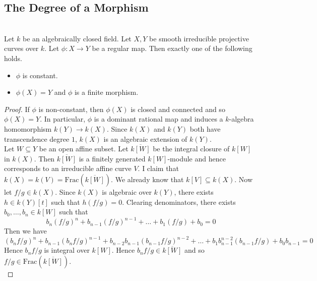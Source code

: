 \documentclass[a4paper]{article}
\begin{document}
\subsection{The Degree of a Morphism}
\begin{prp}{}{}\\
Let $k$ be an algebraically closed field. Let $X,Y$ be smooth irreducible projective curves over $k$. Let $\phi:X\to Y$ be a regular map. Then exactly one of the following holds. 
\begin{itemize}
\item $\phi$ is constant. 
\item $\phi(X)=Y$ and $\phi$ is a finite morphism. 
\end{itemize}
\begin{proof}
If $\phi$ is non-constant, then $\phi(X)$ is closed and connected and so $\phi(X)=Y$. In particular, $\phi$ is a dominant rational map and induces a $k$-algebra homomorphism $k(Y)\to k(X)$. Since $k(X)$ and $k(Y)$ both have transcendence degree $1$, $k(X)$ is an algebraic extension of $k(Y)$. \\

Let $W\subseteq Y$ be an open affine subset. Let $\overline{k[W]}$ be the integral closure of $k[W]$ in $k(X)$. Then $\overline{k[W]}$ is a finitely generated $k[W]$-module and hence corresponds to an irreducible affine curve $V$. I claim that $k(X)=k(V)=\text{Frac}(\overline{k[W]})$. We already know that $k[V]\subseteq k(X)$. Now let $f/g\in k(X)$. Since $k(X)$ is algebraic over $k(Y)$, there exists $h\in k(Y)[t]$ such that $h(f/g)=0$. Clearing denominators, there exists $b_0,\dots,b_n\in k[W]$ such that $$b_n(f/g)^n+b_{n-1}(f/g)^{n-1}+\dots+b_1(f/g)+b_0=0$$ Then we have $$(b_nf/g)^n+b_{n-1}(b_nf/g)^{n-1}+b_{n-2}b_{n-1}(b_{n-1}f/g)^{n-2}+\dots+b_1b_{n-1}^{n-2}(b_{n-1}f/g)+b_0b_{n-1}=0$$ Hence $b_nf/g$ is integral over $k[W]$. Hence $b_nf/g\in\overline{k[W]}$ and so $f/g\in\text{Frac}(\overline{k[W]})$. \\


\end{proof}
\end{prp}
\end{document}
